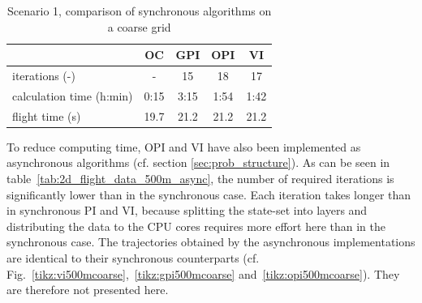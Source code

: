 \begin{table}[htb]
	\begin{center}
		\begin{tabular}{l|c c c c}
			 & OC & GPI & OPI & VI \\ \hline
			iterations (-) & - & 15 & 18 & 17 \\
			calculation time (h:min) & 0:15 & 3:15 & 1:54 & 1:42 \\
			flight time (s) & 19.7 & 21.2 & 21.2 & 21.2
		\end{tabular}
		\caption{Scenario 1, comparison of synchronous algorithms on a coarse grid}
		\label{tab:2d_flight_data_500m}
	\end{center}
\end{table}

To reduce computing time, OPI and VI have also been implemented as asynchronous algorithms (cf. section \ref{sec:prob_structure}). As can be seen in table~\ref{tab:2d_flight_data_500m_async}, the number of required iterations is significantly lower than in the synchronous case. Each iteration takes longer than in synchronous PI and VI, because splitting the state-set into layers and distributing the data to the CPU cores requires more effort here than in the synchronous case. The trajectories obtained by the asynchronous implementations are identical to their synchronous counterparts (cf. Fig.~\ref{tikz:vi500mcoarse},~\ref{tikz:gpi500mcoarse} and~\ref{tikz:opi500mcoarse}). They are therefore not presented here.

